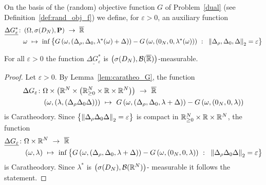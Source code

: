 On the basis of the (random) objective function $G$ of Problem~\ref{dual} (see Definition~\ref{def:rand_obj_f}) we define, for $\varepsilon>0$, an auxiliary function
   \begin{align*}
     \underline{
     \Delta G^*
     _\varepsilon
     }
     \colon
     &
     \left( \Omega,\sigma(D_N),\P \right)
     \ 
     \to
     \ 
     \overline{\R}
     \\
     &
     \omega
     \ 
     \mapsto
     \ 
   \inf
   \left\{ 
 G
   \left( 
     \omega,
     \left( 
\Delta_\rho,\Delta_0,\lambda^*(\omega)+\Delta
     \right)
   \right)
   -
   G
   \left(
     \omega,
     \left( 
0_N,0,\lambda^*(\omega)
     \right)
   \right)
   \ 
   \colon
   \ 
   \norm{
\Delta_\rho,\Delta_0,\Delta
   }_2
   =\varepsilon
   \right\}
   \end{align*}
\begin{lemma}
\label{lem:meas_inf_G}
  For all $\varepsilon>0$ the function
  $
     \underline{
     \Delta G^*
     _\varepsilon
     }
  $
  is
  $
  \left( 
  \sigma(D_N),\mathcal{B}(\overline{\mathbb{R}})
  \right)
  $-measurable.
\end{lemma}
\begin{proof}
  Let $\varepsilon>0$.
  By Lemma~\ref{lem:caratheo_G}, the function
\begin{align*}
     \Delta G
     _\varepsilon
     \colon
     &
     \Omega
     \times
     \left( 
     \R^N
     \times
    \left( 
    \R^N_{\ge 0}\times\R\times\R^N
    \right)
     \right)
     \ 
     \to
     \ 
     \overline{\R}
     \\
     &
     \left( 
     \omega
     ,
     \left( 
     \lambda,
     \left( 
\Delta_\rho\Delta_0\Delta
     \right)
     \right)
     \right)
     \ 
     \mapsto
     \ 
 G
   \left( 
     \omega,
     \left( 
\Delta_\rho,\Delta_0,\lambda+\Delta
     \right)
   \right)
   -
   G
   \left(
     \omega,
     \left( 
0_N,0,\lambda
     \right)
   \right)
   \end{align*}
is Caratheodory.
Since
  $
  \left\{
   \left\lVert
\Delta_\rho\\\Delta_0\\\Delta
   \right\rVert_2
   =\varepsilon
  \right\}
  $
  is compact in 
  $
    \mathbb{R}^N_{\ge 0}\times\mathbb{R}\times\mathbb{R}^N
    $,
  the function
\begin{align*}
  \underline{
     \Delta G
     _\varepsilon
  }
     \colon
     &
     \Omega
     \times
     \R^N
     \ 
     \to
     \ 
     \overline{\R}
     \\
     &
     \left( 
     \omega
     ,
     \lambda
     \right)
     \ 
     \mapsto
     \ 
   \inf
    \left\{ 
 G
   \left( 
     \omega,
     \left( 
\Delta_\rho,\Delta_0,\lambda+\Delta
     \right)
   \right)
   -
   G
   \left(
     \omega,
     \left( 
0_N,0,\lambda
     \right)
   \right)
   \ 
   \colon
   \ 
   \norm{
\Delta_\rho\Delta_0\Delta
   }_2
   =\varepsilon
    \right\}
   \end{align*}
is Caratheodory.
Since 
$
\lambda^*
$
is 
$
\left( 
\sigma
(D_N)
,
\mathcal{B}(\mathbb{R}^N)
\right)
$-
measurable it follows the statement.
\end{proof}
